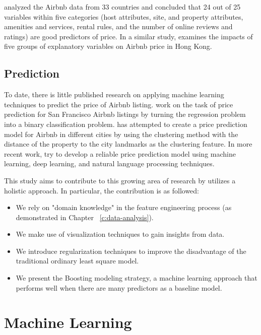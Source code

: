 \textcite{wang2017price} analyzed the Airbnb data from 33 countries and concluded
that 24 out of 25 variables within five categories (host attributes, site, and
property attributes, amenities and services, rental rules, and the number of
online reviews and ratings) are good predictors of price.  In a similar study,
\textcite{cai2019price} examines the impacts of five groups of
explanatory variables on Airbnb price in Hong Kong.


\subsection{Prediction}

To date, there is little published research on applying machine learning
techniques to predict the price of Airbnb listing.
\textcite{tang2015neighborhood} work on the task of price prediction for San
Francisco Airbnb listings by turning the regression problem into a binary
classification problem.
\textcite{li2016reasonable} has attempted to create a price prediction model for
Airbnb in different cities by using the clustering method with the distance of
the property to the city landmarks as the clustering feature.
In more recent work, \textcite{kalehbasti2019airbnb}  try to develop a reliable
price prediction model using machine learning, deep learning, and natural
language processing techniques.


This study aims to contribute to this growing area of research by utilizes a
holistic approach. In particular, the contribution is as followed:
\begin{itemize}
  \item We rely on "domain knowledge" in the feature engineering process (as
    demonstrated in Chapter ~\ref{c:data-analysis}).
  \item We make use of visualization techniques to gain insights from data.
  \item We introduce regularization techniques to improve the disadvantage of the
  traditional ordinary least square model.
  \item We present the Boosting modeling strategy, a machine learning approach
    that performs well when there are many predictors as a baseline model.
\end{itemize}

\section{Machine Learning}

